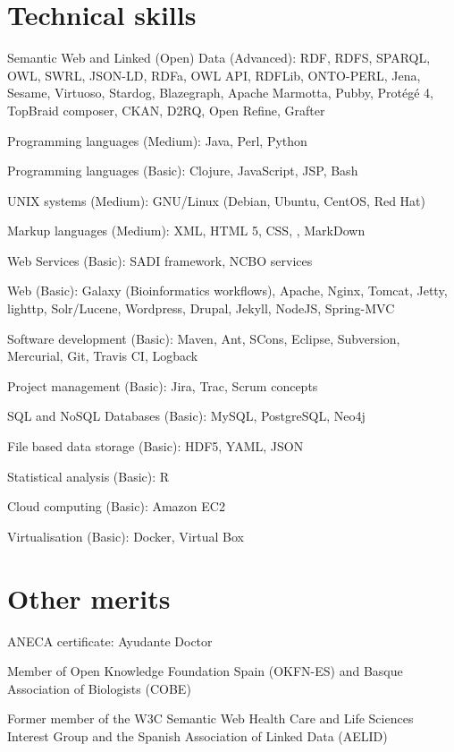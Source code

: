 \documentclass[11pt,fullpage]{article}
\renewenvironment{itemize}{
  \begin{list}{}{
    \setlength{\leftmargin}{1.5em} 
  }  
}{
  \end{list}
}
\begin{document}
\section*{Technical skills}
\begin{itemize}
	\item Semantic Web and Linked (Open) Data (Advanced): RDF, RDFS, SPARQL, OWL, SWRL, JSON-LD, RDFa, OWL API, RDFLib, ONTO-PERL, Jena, Sesame, Virtuoso, Stardog, Blazegraph, Apache Marmotta, Pubby, Prot\'eg\'e 4, TopBraid composer, CKAN, D2RQ, Open Refine, Grafter
	\item Programming languages (Medium): Java, Perl, Python
	\item Programming languages (Basic): Clojure, JavaScript, JSP, Bash
	\item UNIX systems (Medium): GNU/Linux (Debian, Ubuntu, CentOS, Red Hat) 
	\item Markup languages (Medium): XML, HTML 5, CSS, \LaTeXe, MarkDown
	\item Web Services (Basic): SADI framework, NCBO services
	\item Web (Basic): Galaxy (Bioinformatics workflows), Apache, Nginx, Tomcat, Jetty, lighttp, Solr/Lucene, Wordpress, Drupal, Jekyll, NodeJS, Spring-MVC
	\item Software development (Basic): Maven, Ant, SCons, Eclipse, Subversion, Mercurial, Git, Travis CI, Logback
	\item Project management (Basic): Jira, Trac, Scrum concepts
	\item SQL and NoSQL Databases (Basic): MySQL, PostgreSQL, Neo4j
	\item File based data storage (Basic): HDF5, YAML, JSON
	\item Statistical analysis (Basic): R
	\item Cloud computing (Basic): Amazon EC2
	\item Virtualisation (Basic): Docker, Virtual Box
\end{itemize}

\section*{Other merits}
\begin{itemize}
	\item ANECA certificate: Ayudante Doctor
	\item Member of Open Knowledge Foundation Spain (OKFN-ES) and Basque Association of Biologists (COBE)
	\item Former member of the W3C Semantic Web Health Care and Life Sciences Interest Group and the Spanish Association of Linked Data (AELID) 
\end{itemize}
\end{document}
